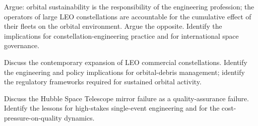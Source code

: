 \begin{exercise}
Argue: orbital sustainability is the responsibility of the engineering profession; the operators of large LEO constellations are accountable for the cumulative effect of their fleets on the orbital environment. Argue the opposite. Identify the implications for constellation-engineering practice and for international space governance.
\end{exercise}

\begin{exercise}
Discuss the contemporary expansion of LEO commercial constellations. Identify the engineering and policy implications for orbital-debris management; identify the regulatory frameworks required for sustained orbital activity.
\end{exercise}

\begin{exercise}
Discuss the Hubble Space Telescope mirror failure as a quality-assurance failure. Identify the lessons for high-stakes single-event engineering and for the cost-pressure-on-quality dynamics.
\end{exercise}
